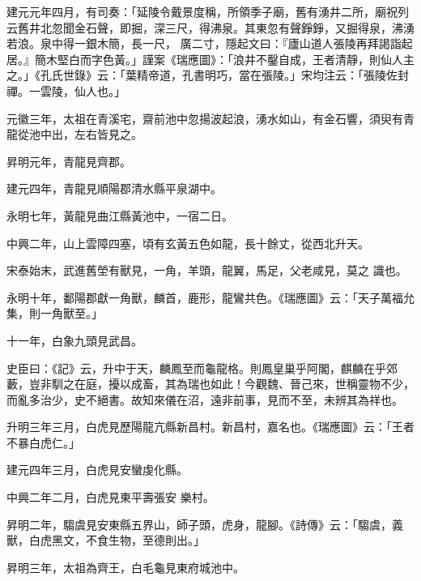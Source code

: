 \begin{pinyinscope}
 建元元年四月，有司奏：「延陵令戴景度稱，所領季子廟，舊有湧井二所，廟祝列云舊井北忽聞金石聲，即掘，深三尺，得沸泉。其東忽有聲錚錚，又掘得泉，沸湧若浪。泉中得一銀木簡，長一尺，
 廣二寸，隱起文曰：『廬山道人張陵再拜謁詣起居。』簡木堅白而字色黃。」謹案《瑞應圖》：「浪井不鑿自成，王者清靜，則仙人主之。」《孔氏世錄》云：「葉精帝道，孔書明巧，當在張陵。」宋均注云：「張陵佐封禪。一雲陵，仙人也。」



 元徽三年，太祖在青溪宅，齋前池中忽揚波起浪，湧水如山，有金石響，須臾有青龍從池中出，左右皆見之。



 昇明元年，青龍見齊郡。



 建元四年，青龍見順陽郡清水縣平泉湖中。



 永明七年，黃龍見曲江縣黃池中，一宿二日。



 中興二年，山上雲障四塞，頃有玄黃五色如龍，長十餘丈，從西北升天。



 宋泰始末，武進舊塋有獸見，一角，羊頭，龍翼，馬足，父老咸見，莫之
 識也。



 永明十年，鄱陽郡獻一角獸，麟首，鹿形，龍鸞共色。《瑞應圖》云：「天子萬福允集，則一角獸至。」



 十一年，白象九頭見武昌。



 史臣曰：《記》云，升中于天，麟鳳至而龜龍格。則鳳皇巢乎阿閣，麒麟在乎郊藪，豈非馴之在庭，擾以成畜，其為瑞也如此！今觀魏、晉己來，世稱靈物不少，而亂多治少，史不絕書。故知來儀在沼，遠非前事，見而不至，未辨其為祥也。



 升明三年三月，白虎見歷陽龍亢縣新昌村。新昌村，嘉名也。《瑞應圖》云：「王者不暴白虎仁。」



 建元四年三月，白虎見安蠻虔化縣。



 中興二年二月，白虎見東平壽張安
 樂村。



 昇明二年，騶虞見安東縣五界山，師子頭，虎身，龍腳。《詩傳》云：「騶虞，義獸，白虎黑文，不食生物，至德則出。」



 昇明三年，太祖為齊王，白毛龜見東府城池中。




\end{pinyinscope}
